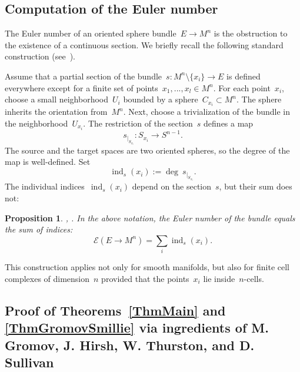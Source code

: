 \documentclass[12pt]{amsart}
\theoremstyle{plain}
\newtheorem{proposition}[theorem]{Proposition}
\theoremstyle{definition}
\theoremstyle{plain}
\theoremstyle{definition}
\DeclareMathOperator{\ind}{ind}
\begin{document}
\bigskip
\fi



\subsection{Computation of the Euler number}\label{SecComputeEuler}

The Euler number of an oriented sphere bundle~$E\rightarrow M^n$ is the obstruction to the existence of a continuous section. We briefly recall the following standard construction (see~\cite{FomFu}).

	 Assume
	that a partial section of the bundle~$s: M^n\setminus\{x_i\}\rightarrow E$ is defined everywhere except for a finite set of points~$x_1,...,x_l\in M^n$.
	For each point~$x_i$, choose   a small neighborhood~$U_i$ bounded by a  sphere~$C_{x_i}\subset M^n$. The sphere inherits the orientation from~$M^n$.  
	Next, choose a trivialization of the bundle in the neighborhood~$U_{x_i}$.
	The  restriction of the section~$s$
	defines  a map 
	$$s_{\mid_{S_{x_i}}}:S_{x_i}\rightarrow S^{n-1}.$$  
	The source and the target spaces are two oriented spheres, 
	so the degree of the map is well-defined. Set
	$$\ind_s(x_i):= \deg~ s_{\mid_{S_{x_i}}}.$$ 
	The individual indices~$\ind_s(x_i)$ depend on the section~$s$, but their sum  does not:
	
	\begin{proposition} \cite{Milnor}, \cite{FomFu}.
		In the above notation, the Euler number of the bundle equals the sum of indices:
$$\mathcal{E}(E\rightarrow M^n)=\sum_i \ind_s(x_i).$$
	\end{proposition}\label{PropEulerComput}


This construction applies not only for smooth manifolds, but also for finite cell complexes of dimension~$n$ provided that the points~$x_i$ lie inside~$n$-cells.
\medskip




\subsection{Proof of Theorems~\ref{ThmMain} and \ref{ThmGromovSmillie} via ingredients of M. Gromov, J. Hirsh, W. Thurston, and D. Sullivan}
\end{document}
